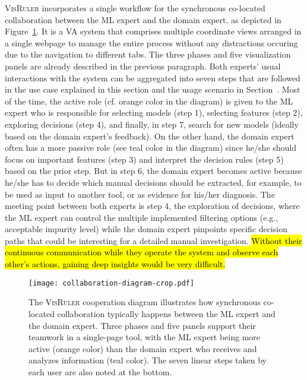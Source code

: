 \textsc{VisRuler} incorporates a single workflow for the synchronous co-located collaboration between the ML expert and the domain expert, as depicted in Figure~\ref{fig:collaboration-diagram}. It is a VA system that comprises multiple coordinate views arranged in a single webpage to manage the entire process without any distractions occuring due to the navigation to different tabs. The three phases and five visualization panels are already described in the previous paragraph. Both experts' usual interactions with the system can be aggregated into seven steps that are followed in the use case explained in this section and the usage scenario in Section~. Most of the time, the active role (cf. orange color in the diagram) is given to the ML expert who is responsible for selecting models (step 1), selecting features (step 2), exploring decisions (step 4), and finally, in step 7, search for new models (ideally based on the domain expert's feedback). On the other hand, the domain expert often has a more passive role (see teal color in the diagram) since he/she should focus on important features (step 3) and interpret the decision rules (step 5) based on the prior step. But in step 6, the domain expert becomes active because he/she has to decide which manual decisions should be extracted, for example, to be used as input to another tool, or as evidence for his/her diagnosis. The meeting point between both experts is step 4, the exploration of decisions, where the ML expert can control the multiple implemented filtering options (e.g., acceptable impurity level) while the domain expert pinpoints specific decision paths that could be interesting for a detailed manual investigation. \hl{Without their continuous communication while they operate the system and observe each other's actions, gaining deep insights would be very difficult.}

\begin{figure}[t]
\centering
\texttt{[image: collaboration-diagram-crop.pdf]}
\caption{The \textsc{VisRuler} cooperation diagram illustrates how synchronous co-located collaboration typically happens between the ML expert and the domain expert. Three phases and five panels support their teamwork in a single-page tool, with the ML expert being more active (orange color) than the domain expert who receives and analyzes information (teal color). The seven linear steps taken by each user are also noted at the bottom.}
\label{fig:collaboration-diagram}
\end{figure}


